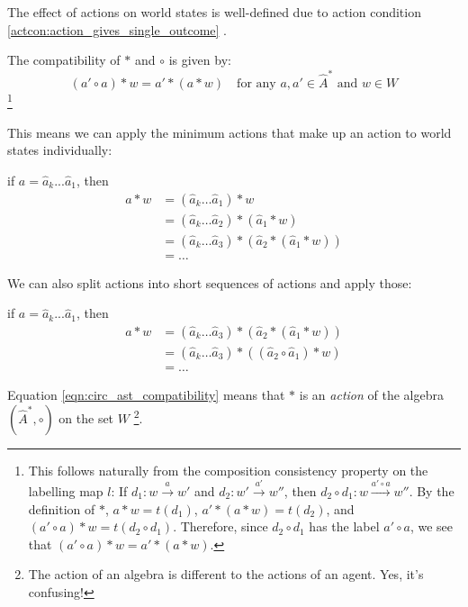 The effect of actions on world states is well-defined due to action condition \ref{actcon:action_gives_single_outcome} .

The compatibility of $\ast$ and $\circ$ is given by:
\begin{equation}\label{eqn:circ_ast_compatibility}
    (a' \circ a) \ast w = a' \ast (a \ast w) \quad \text{for any $a, a' \in \hat{A}^{\ast}$ and $w \in W$}
\end{equation}
\footnote{
This follows naturally from the composition consistency property on the labelling map $l$:
If $d_{1}: w \xrightarrow{a} w'$ and $d_{2}: w' \xrightarrow{a'} w''$, then $d_{2} \circ d_{1}: w \xrightarrow{a' \circ a} w''$.
By the definition of $\ast$, $a * w = t(d_{1})$, $a' \ast (a \ast w) = t(d_{2})$, and $(a' \circ a) \ast w = t(d_{2} \circ d_{1})$.
Therefore, since $d_{2} \circ d_{1}$ has the label $a' \circ a$, we see that $(a' \circ a) \ast w = a' \ast (a \ast w)$.
}

This means we can apply the minimum actions that make up an action to world states individually:

if $a = \hat{a}_{k}...\hat{a}_{1}$, then
\begin{align}
	a \ast w & = (\hat{a}_{k} \dots \hat{a}_{1}) \ast w                                       \\
	         & = (\hat{a}_{k} \dots \hat{a}_{2}) \ast (\hat{a}_{1} \ast w)                    \\
	         & = (\hat{a}_{k} \dots \hat{a}_{3}) \ast (\hat{a}_{2} \ast (\hat{a}_{1} \ast w)) \\
	         & = \dots
\end{align}

We can also split actions into short sequences of actions and apply those:

if $a = \hat{a}_{k}...\hat{a}_{1}$, then
\begin{align}
	a \ast w & = (\hat{a}_{k} \dots \hat{a}_{3}) \ast (\hat{a}_{2} \ast (\hat{a}_{1} \ast w)) \\
	         & = (\hat{a}_{k} \dots \hat{a}_{3}) \ast ((\hat{a}_{2} \circ \hat{a}_{1}) \ast w)      \\
	         & = \dots
\end{align}

Equation \ref{eqn:circ_ast_compatibility} means that $\ast$ is an \emph{action} of the algebra $(\hat{A}^{\ast}, \circ)$ on the set $W$ \footnote{
The action of an algebra is different to the actions of an agent.
Yes, it's confusing!
}.


